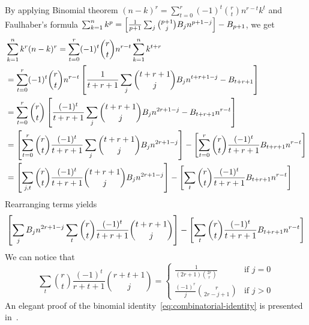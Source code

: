 By applying Binomial theorem $(n-k)^r=\sum_{t=0}^{r} (-1)^t \binom{r}{t} n^{r-t} k^t$ and Faulhaber's formula
$\sum_{k=1}^{n} k^{p} = \left[ \frac{1}{p+1}\sum_{j} \binom{p+1}{j} {B}\sb{j} n^{p+1-j} \right] - {B}\sb{p+1}$, we get
\begin{align*}
    &\sum_{k=1}^{n} k^{r} (n-k)^{r}
    = \sum_{t=0}^{r} (-1)^t \binom{r}{t} n^{r-t} \sum_{k=1}^{n} k^{t+r} \\
    &= \sum_{t=0}^{r} (-1)^t \binom{r}{t} n^{r-t} \left[ \frac{1}{t+r+1} \sum_{j} \binom{t+r+1}{j} {B}\sb{j} n^{t+r+1-j} - {B}\sb{t+r+1} \right] \\
    &= \sum_{t=0}^{r} \binom{r}{t} \left[ \frac{(-1)^t}{t+r+1} \sum_{j} \binom{t+r+1}{j} {B}\sb{j} n^{2r+1-j} - {B}\sb{t+r+1} n^{r-t} \right] \\
    &= \left[ \sum_{t=0}^{r} \binom{r}{t} \frac{(-1)^t}{t+r+1} \sum_{j} \binom{t+r+1}{j} {B}\sb{j} n^{2r+1-j}  \right]
    - \left[ \sum_{t=0}^{r} \binom{r}{t} \frac{(-1)^t}{t+r+1} {B}\sb{t+r+1} n^{r-t} \right] \\
    &= \left[ \sum_{j, t} \binom{r}{t} \frac{(-1)^t}{t+r+1} \binom{t+r+1}{j} {B}\sb{j} n^{2r+1-j}  \right]
    - \left[ \sum_{t} \binom{r}{t} \frac{(-1)^t}{t+r+1} {B}\sb{t+r+1} n^{r-t} \right]
\end{align*}
Rearranging terms yields
\begin{equation}
    \left[ \sum_{j} {B}\sb{j} n^{2r+1-j} \sum_{t} \binom{r}{t} \frac{(-1)^t}{t+r+1} \binom{t+r+1}{j}  \right]
    - \left[ \sum_{t} \binom{r}{t} \frac{(-1)^t}{t+r+1} {B}\sb{t+r+1} n^{r-t} \right]
    \label{eq:rearranging-terms}
\end{equation}
We can notice that
\begin{equation}
    \label{eq:combinatorial-identity}
    \sum_{t} \binom{r}{t} \frac{(-1)^t}{r+t+1} \binom{r+t+1}{j}
    =\begin{cases}
         \frac{1}{(2r+1) \binom{2r}r} & \text{if } j=0\\
         \frac{(-1)^r}{j} \binom{r}{2r-j+1} & \text{if } j>0
    \end{cases}
\end{equation}
An elegant proof of the binomial identity~\eqref{eq:combinatorial-identity} is presented in~\cite{scheuer2023mathstackexchange}.

